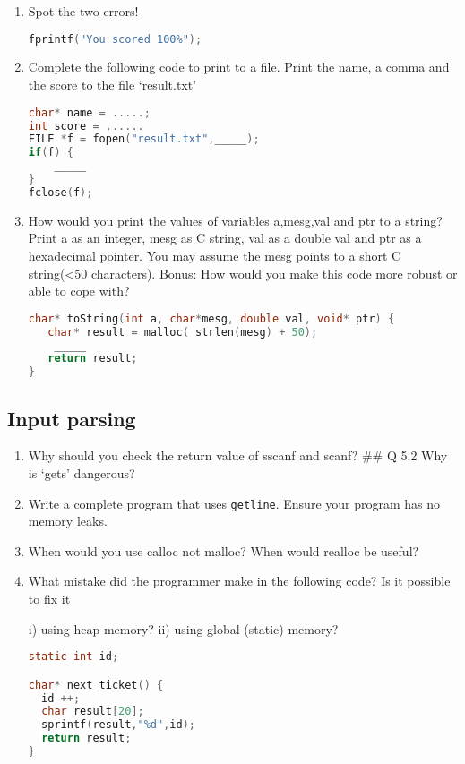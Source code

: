 \begin{enumerate}

\item Spot the two errors!

\begin{lstlisting}[language=C]
fprintf("You scored 100%");
\end{lstlisting}

\item Complete the following code to print to a file. Print the name, a comma and the score to the file `result.txt'

\begin{lstlisting}[language=C]
char* name = .....;
int score = ......
FILE *f = fopen("result.txt",_____);
if(f) {
    _____
}
fclose(f);
\end{lstlisting}

\item How would you print the values of variables a,mesg,val and ptr to a string? Print a as an integer, mesg as C string, val as a double val and ptr as a hexadecimal pointer. You may assume the mesg points to a short C string(\textless{}50 characters). Bonus: How would you make this code more robust or able to cope with?

\begin{lstlisting}[language=C]
char* toString(int a, char*mesg, double val, void* ptr) {
   char* result = malloc( strlen(mesg) + 50);
    _____
   return result;
}
\end{lstlisting}

\end{enumerate}

\subsection{Input parsing}

\begin{enumerate}
\item Why should you check the return value of sscanf and scanf? \#\# Q 5.2 Why is `gets' dangerous?

\item Write a complete program that uses \texttt{getline}. Ensure your program has no memory leaks.

\item When would you use calloc not malloc? When would realloc be useful?

\item What mistake did the programmer make in the following code? Is it possible to fix it

i) using heap memory?
ii) using global (static) memory?

\begin{lstlisting}[language=C]
static int id;

char* next_ticket() {
  id ++;
  char result[20];
  sprintf(result,"%d",id);
  return result;
}
\end{lstlisting}

\end{enumerate}

